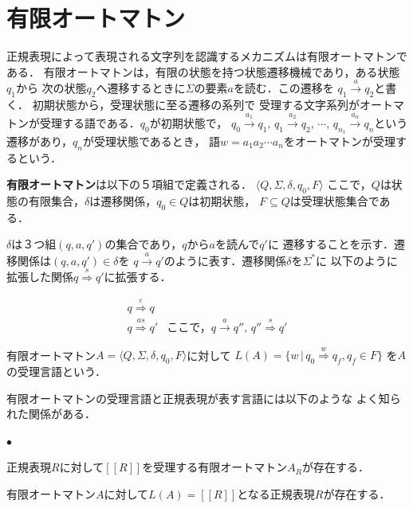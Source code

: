 \documentclass[a4j,dvipdfmx]{jbook}
\begin{document}
\section{有限オートマトン}

正規表現によって表現される文字列を認識するメカニズムは有限オートマトンである．
有限オートマトンは，有限の状態を持つ状態遷移機械であり，ある状態$q_1$から
次の状態$q_2$へ遷移するときに$\Sigma$の要素$a$を読む．この遷移を
$q_1\xrightarrow{a}q_2$と書く．
初期状態から，受理状態に至る遷移の系列で
受理する文字系列がオートマトンが受理する語である．$q_0$が初期状態で，
$q_0\xrightarrow{a_1}q_1$, $q_1\xrightarrow{a_2}q_2$, $\cdots$,
$q_{n_1}\xrightarrow{a_n}q_n$という遷移があり，$q_n$が受理状態であるとき，
語$w=a_1a_2\cdots a_n$をオートマトンが受理するという．

\begin{Def}
  {\bf 有限オートマトン}は以下の５項組で定義される．
  $\langle Q,\Sigma,\delta,q_0,F\rangle$
  ここで，$Q$は状態の有限集合，$\delta$は遷移関係，$q_0\in Q$は初期状態，
  $F\subseteq Q$は受理状態集合である．
\end{Def}

$\delta$は３つ組$(q,a,q')$の集合であり，$q$から$a$を読んで$q'$に
遷移することを示す．遷移関係は$(q,a,q')\in\delta$を
$q\xrightarrow{a}q'$のように表す．遷移関係$\delta$を$\Sigma^\ast$に
以下のように拡張した関係$q\stackrel{s}{\Rightarrow}q'$に拡張する．

\[\begin{array}{ll}
    q\stackrel{\varepsilon}{\Rightarrow}q &                                  \\
    q\stackrel{as}{\Rightarrow}q'         & \mbox{ここで，$q\xrightarrow{a}q''$,
      $q''\stackrel{s}{\Rightarrow}q'$}
  \end{array}\]

\begin{Def}
  有限オートマトン$A=\langle Q,\Sigma,\delta,q_0,F\rangle$に対して
  $L(A)=\{w\,|\,q_0\stackrel{w}{\Rightarrow}q_f, q_f\in F\}$
  を$A$の受理言語という．
\end{Def}

有限オートマトンの受理言語と正規表現が表す言語には以下のような
よく知られた関係がある．

\begin{Thm}
  \begin{list}{$\bullet$}{}
    \item 正規表現$R$に対して$[\![R]\!]$を受理する有限オートマトン$A_R$が存在する．
    \item 有限オートマトン$A$に対して$L(A)=[\![R]\!]$となる正規表現$R$が存在する．
  \end{list}
\end{Thm}
\end{document}
